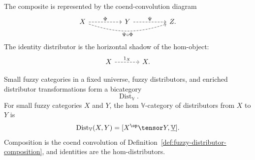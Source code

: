 The composite is represented by the coend-convolution diagram
\[
\begin{tikzcd}[column sep=huge,row sep=large]
X
    \ar[r,dashed,"\Phi"]
    \ar[rr,bend right=18,dashed,"\Psi\circ\Phi"']
&
Y
    \ar[r,dashed,"\Psi"]
&
Z.
\end{tikzcd}
\]
The identity distributor is the horizontal shadow of the hom-object:
\[
\begin{tikzcd}[column sep=large,row sep=large]
X
    \ar[r,dashed,"1_X"]
&
X.
\end{tikzcd}
\]

\begin{proposition}
\label{prop:fuzzy-distributor-bicategory}
Small fuzzy categories in a fixed universe, fuzzy distributors, and enriched
distributor transformations form a bicategory
\[
    \operatorname{Dist}_{\mathbb V}.
\]
For small fuzzy categories \(X\) and \(Y\), the hom \(\mathbb V\)-category of
distributors from \(X\) to \(Y\) is
\[
    \operatorname{Dist}_{\mathbb V}(X,Y)
    =
    [X^{\op}\tensor Y,\underline{\mathbb V}].
\]
Composition is the coend convolution of
Definition~\ref{def:fuzzy-distributor-composition}, and identities are the
hom-distributors.
\end{proposition}

